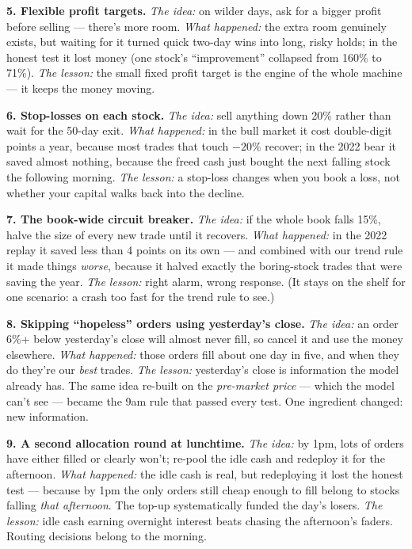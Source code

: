 \documentclass[11pt,a4paper]{article}
\begin{document}
\textbf{5. Flexible profit targets.} \emph{The idea:} on wilder days,
ask for a bigger profit before selling --- there's more room. \emph{What
happened:} the extra room genuinely exists, but waiting for it turned quick
two-day wins into long, risky holds; in the honest test it lost money
(one stock's ``improvement'' collapsed from 160\% to 71\%). \emph{The
lesson:} the small fixed profit target is the engine of the whole machine
--- it keeps the money moving.

\textbf{6. Stop-losses on each stock.} \emph{The idea:} sell anything down
20\% rather than wait for the 50-day exit. \emph{What happened:} in the
bull market it cost double-digit points a year, because most trades that
touch $-20\%$ recover; in the 2022 bear it saved almost nothing, because
the freed cash just bought the next falling stock the following morning.
\emph{The lesson:} a stop-loss changes when you book a loss, not whether
your capital walks back into the decline.

\textbf{7. The book-wide circuit breaker.} \emph{The idea:} if the whole
book falls 15\%, halve the size of every new trade until it recovers.
\emph{What happened:} in the 2022 replay it saved less than 4 points on its
own --- and combined with our trend rule it made things \emph{worse},
because it halved exactly the boring-stock trades that were saving the
year. \emph{The lesson:} right alarm, wrong response. (It stays on the
shelf for one scenario: a crash too fast for the trend rule to see.)

\textbf{8. Skipping ``hopeless'' orders using yesterday's close.} \emph{The
idea:} an order 6\%+ below yesterday's close will almost never fill, so
cancel it and use the money elsewhere. \emph{What happened:} those orders
fill about one day in five, and when they do they're our \emph{best}
trades. \emph{The lesson:} yesterday's close is information the model
already has. The same idea re-built on the \emph{pre-market price} --- which
the model can't see --- became the 9am rule that passed every test. One
ingredient changed: new information.

\textbf{9. A second allocation round at lunchtime.} \emph{The idea:} by
1pm, lots of orders have either filled or clearly won't; re-pool the idle
cash and redeploy it for the afternoon. \emph{What happened:} the idle cash
is real, but redeploying it lost the honest test --- because by 1pm the only
orders still cheap enough to fill belong to stocks falling \emph{that
afternoon}. The top-up systematically funded the day's losers. \emph{The
lesson:} idle cash earning overnight interest beats chasing the afternoon's
faders. Routing decisions belong to the morning.
\end{document}
